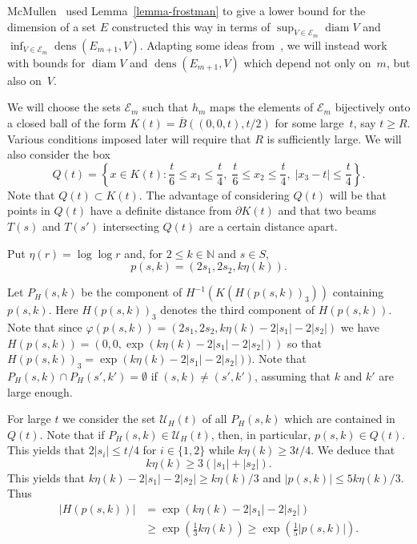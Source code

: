 \documentclass[12pt,a4paper]{amsart}
\theoremstyle{plain}
\theoremstyle{definition}
\theoremstyle{remark}
\newcommand{\diam}{\operatorname{diam}}
\def\N{\mathbb N}
\def\cE{\mathcal E}
\def\cU{\mathcal U}
\def\dens{\operatorname{dens}}
\numberwithin{equation}{section}
\begin{document}
McMullen~\cite{McMullen1987} used Lemma~\ref{lemma-frostman} to give a lower bound 
for the dimension of a set $E$ constructed this way in terms of 
$\sup_{V\in\cE_m}\diam V$ and $\inf_{V\in\cE_m}\dens(E_{m+1},V)$.
Adapting some ideas from~\cite{BKS},
we will instead work with bounds for $\diam V$ and $\dens(E_{m+1},V)$
which depend not only on~$m$, but also on~$V$.

We will choose the sets ${\mathcal E}_m$ such that $h_m$ maps the elements
of $\cE_m$ bijectively onto a closed ball of the form 
$K(t)=\overline{B}((0,0,t),t/2)$ for some large~$t$, say $t\geq R$.
Various conditions imposed later will require that $R$ is sufficiently large.
We will also consider the box
\begin{equation}\label{3c2}
Q(t)=\left\{x\in K(t)\colon \frac{t}{6}\leq x_1\leq \frac{t}{4},\;
\frac{t}{6}\leq x_2\leq \frac{t}{4},\;
|x_3-t|\leq \frac{t}{4}\right\} .
\end{equation}
Note that $Q(t)\subset K(t)$.
The advantage of considering $Q(t)$ will be that points in $Q(t)$ have a definite
distance from $\partial K(t)$ and that two beams $T(s)$ and $T(s')$ intersecting 
$Q(t)$ are a certain distance apart.

Put $\eta(r)=\log\log r$ and, for $ 2\leq k\in\N$ and $s\in S$, 
\begin{equation}\label{3d}
p(s,k)=(2s_1,2s_2,k\eta(k)).
\end{equation}

Let $P_H(s,k)$ be the component of $H^{-1}(K(H(p(s,k))_3))$ containing $p(s,k)$.
Here $H(p(s,k))_3$ denotes the third component of $H(p(s,k))$.
Note that since
$\varphi(p(s,k))=(2s_1,2s_2,k\eta(k)-2|s_1|-2|s_2|)$
we have 
$H(p(s,k))=(0,0,\exp(k\eta(k)-2|s_1|-2|s_2|))$ 
so that $H(p(s,k))_3=\exp(k\eta(k)-2|s_1|-2|s_2|))$.
Note that $P_H(s,k)\cap P_H(s',k')=\emptyset$ if $(s,k)\neq (s',k')$, assuming that
$k$ and $k'$ are large enough.

For large $t$ we consider the set $\cU_H(t)$ 
of all $P_H(s,k)$ which are contained in $Q(t)$.
Note that if $P_H(s,k)\in \cU_H(t)$, then, in particular, $p(s,k)\in Q(t)$.
This yields that  $2|s_i|\leq t/4$ for $i\in\{1,2\}$ while $k\eta(k)\geq 3t/4$.
We deduce that 
\begin{equation}\label{3d0}
k\eta(k)\geq 3(|s_1|+|s_2|).
\end{equation}
This yields  that $k\eta(k)-2|s_1|-2|s_2|\geq k\eta(k)/3$
and $|p(s,k)|\leq 5k\eta(k)/3$.
Thus
\begin{equation}\label{3d1}
\begin{aligned}
|H(p(s,k))|
&=\exp(k\eta(k)-2|s_1|-2|s_2|)
\\ &
\geq \exp\!\left( \frac13 k\eta(k)\right)\geq \exp\!\left(\frac15 |p(s,k)|\right).
\end{aligned}
\end{equation}
\end{document}

